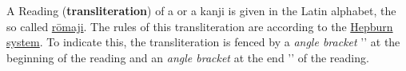 \begin{itemize}
         A Reading (\textbf{transliteration}) of a \jtopic{} or a kanji is
         given in the Latin alphabet, the so called
         \hyperref[sec:Romaji]{rōmaji}. The rules of this transliteration are
         according to the \hyperref[sec:Hepburn]{Hepburn system}. To indicate
         this, the transliteration is fenced by a \textit{angle bracket}
         '\textlangle{}' at the beginning of the reading and an \textit{angle
         bracket} at the end '\textrangle{}' of the reading.




\end{itemize}
